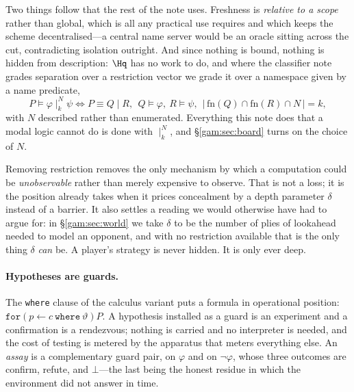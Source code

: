 Two things follow that the rest of the note uses. Freshness is
\emph{relative to a scope} rather than global, which is all any practical use
requires and which keeps the scheme decentralised---a central name server would
be an oracle sitting across the cut, contradicting isolation outright. And since
nothing is bound, nothing is hidden from description: $\Hq$ has no work to do,
and where the classifier note grades separation over a restriction vector we
grade it over a namespace given by a name predicate,
\[
P \models \varphi \mid_k^{N} \psi \iff P \equiv Q\mid R,\ \ Q \models \varphi,\
R \models \psi,\ \ |\,\mathrm{fn}(Q)\cap \mathrm{fn}(R) \cap N\,| = k ,
\]
with $N$ described rather than enumerated. Everything this note does that a
modal logic cannot do is done with $\mid_k^N$, and \S\ref{gam:sec:board} turns on
the choice of $N$.

\begin{remark}\label{gam:concealment-price-wall}
Removing restriction removes the only mechanism by which a computation could be
\emph{unobservable} rather than merely expensive to observe. That is not a loss;
it is the position \chSci already takes when it prices concealment by
a depth parameter $\delta$ instead of a barrier. It also settles a reading we
would otherwise have had to argue for: in \S\ref{gam:sec:world} we take $\delta$ to
be the number of plies of lookahead needed to model an opponent, and with no
restriction available that is the only thing $\delta$ \emph{can} be. A player's
strategy is never hidden. It is only ever deep.
\end{remark}

\paragraph{Hypotheses are guards.} The \texttt{where} clause of the \rh{}
calculus variant \cite{Omnibus} puts a formula in operational position:
$\texttt{for}(p \leftarrow c \ \texttt{where}\ \vartheta)P$. A hypothesis
installed as a guard is an experiment and a confirmation is a rendezvous;
nothing is carried and no interpreter is needed, and the cost of testing is
metered by the apparatus that meters everything else. An \emph{assay} is a
complementary guard pair, on $\varphi$ and on $\neg\varphi$, whose three
outcomes are \textsf{confirm}, \textsf{refute}, and $\bot$---the last being the
honest residue in which the environment did not answer in time.

